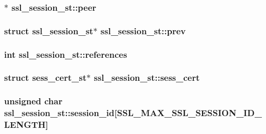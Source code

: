 \subsubsection[{\texorpdfstring{peer}{peer}}]{$\ast$ ssl\+\_\+session\+\_\+st\+::peer}\hypertarget{structssl__session__st_a925bea83587ffedbbdb4aa386b75a2d7}{}\label{structssl__session__st_a925bea83587ffedbbdb4aa386b75a2d7}
\subsubsection[{\texorpdfstring{prev}{prev}}]{\setlength{\rightskip}{0pt plus 5cm}struct {\bf ssl\+\_\+session\+\_\+st}$\ast$ ssl\+\_\+session\+\_\+st\+::prev}\hypertarget{structssl__session__st_a3fa9d04e95c8c04a1ef6b6d87d69fed8}{}\label{structssl__session__st_a3fa9d04e95c8c04a1ef6b6d87d69fed8}
\subsubsection[{\texorpdfstring{references}{references}}]{\setlength{\rightskip}{0pt plus 5cm}int ssl\+\_\+session\+\_\+st\+::references}\hypertarget{structssl__session__st_a1b4fccb7a3ccf9f1521896f8bc900801}{}\label{structssl__session__st_a1b4fccb7a3ccf9f1521896f8bc900801}
\subsubsection[{\texorpdfstring{sess\+\_\+cert}{sess_cert}}]{\setlength{\rightskip}{0pt plus 5cm}struct sess\+\_\+cert\+\_\+st$\ast$ ssl\+\_\+session\+\_\+st\+::sess\+\_\+cert}\hypertarget{structssl__session__st_abd0e4711818e1c3373870f0e09d718be}{}\label{structssl__session__st_abd0e4711818e1c3373870f0e09d718be}
\subsubsection[{\texorpdfstring{session\+\_\+id}{session_id}}]{\setlength{\rightskip}{0pt plus 5cm}unsigned char ssl\+\_\+session\+\_\+st\+::session\+\_\+id\mbox{[}{\bf S\+S\+L\+\_\+\+M\+A\+X\+\_\+\+S\+S\+L\+\_\+\+S\+E\+S\+S\+I\+O\+N\+\_\+\+I\+D\+\_\+\+L\+E\+N\+G\+TH}\mbox{]}}\hypertarget{structssl__session__st_a3e03d6073d29316d9eaecb78938ec92f}{}\label{structssl__session__st_a3e03d6073d29316d9eaecb78938ec92f}
